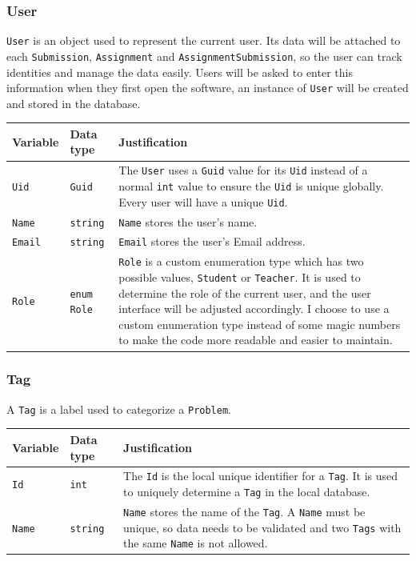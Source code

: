 \documentclass[a4paper]{report}
\begin{document}
\subsubsection{User}

\verb|User| is an object used to represent the current user. Its data will be attached to each \verb|Submission|, \verb|Assignment| and \verb|AssignmentSubmission|, so the user can track identities and manage the data easily. Users will be asked to enter this information when they first open the software, an instance of \verb|User| will be created and stored in the database.

\begin{tabulary}{\textwidth}{|l|l|L|}
    \hline
    Variable & Data type & Justification \\
    \hline
    \verb|Uid| & \verb|Guid| & The \verb|User| uses a \verb|Guid| value for its \verb|Uid| instead of a normal \verb|int| value to ensure the \verb|Uid| is unique globally. Every user will have a unique \verb|Uid|. \\
    \hline
    \verb|Name| & \verb|string| & \verb|Name| stores the user's name. \\
    \hline
    \verb|Email| & \verb|string| & \verb|Email| stores the user's Email address. \\
    \hline
    \verb|Role| & \verb|enum Role| & \verb|Role| is a custom enumeration type which has two possible values, \verb|Student| or \verb|Teacher|. It is used to determine the role of the current user, and the user interface will be adjusted accordingly. I choose to use a custom enumeration type instead of some magic numbers to make the code more readable and easier to maintain. \\
    \hline
\end{tabulary}

\subsubsection{Tag}

A \verb|Tag| is a label used to categorize a \verb|Problem|.

\begin{tabulary}{\textwidth}{|l|l|L|}
    \hline
    Variable & Data type & Justification \\
    \hline
    \verb|Id| & \verb|int| & The \verb|Id| is the local unique identifier for a \verb|Tag|. It is used to uniquely determine a \verb|Tag| in the local database. \\
    \hline
    \verb|Name| & \verb|string| & \verb|Name| stores the name of the \verb|Tag|. A \verb|Name| must be unique, so data needs to be validated and two \verb|Tags| with the same \verb|Name| is not allowed. \\
    \hline
\end{tabulary}
\end{document}
